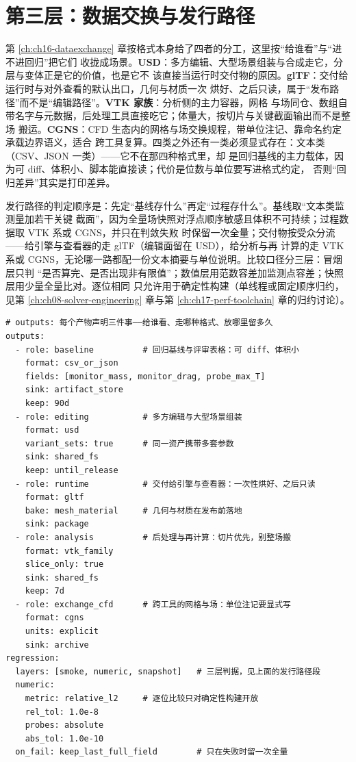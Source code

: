 \documentclass[12pt,a4paper,fontset=fandol]{ctexbook}
\begin{document}
\section{第三层：数据交换与发行路径}
\label{sec:ch18-exchange-routing}

第 \ref{ch:ch16-dataexchange} 章按格式本身给了四者的分工，这里按``给谁看''与``进不进回归''把它们
收拢成场景。\textbf{USD}：多方编辑、大型场景组装与合成走它，分层与变体正是它的价值，也是它不
该直接当运行时交付物的原因。\textbf{glTF}：交付给运行时与对外查看的默认出口，几何与材质一次
烘好、之后只读，属于``发布路径''而不是``编辑路径''。\textbf{VTK 家族}：分析侧的主力容器，网格
与场同仓、数组自带名字与元数据，后处理工具直接吃它；体量大，按切片与关键截面输出而不是整场
搬运。\textbf{CGNS}：CFD 生态内的网格与场交换规程，带单位注记、靠命名约定承载边界语义，适合
跨工具复算。四类之外还有一类必须显式存在：文本类（CSV、JSON 一类）——它不在那四种格式里，却
是回归基线的主力载体，因为可 diff、体积小、脚本能直接读；代价是位数与单位要写进格式约定，
否则``回归差异''其实是打印差异。

发行路径的判定顺序是：先定``基线存什么''再定``过程存什么''。基线取``文本类监测量加若干关键
截面''，因为全量场快照对浮点顺序敏感且体积不可持续；过程数据取 VTK 系或 CGNS，并只在判敛失败
时保留一次全量；交付物按受众分流——给引擎与查看器的走 glTF（编辑面留在 USD），给分析与再
计算的走 VTK 系或 CGNS，无论哪一路都配一份文本摘要与单位说明。比较口径分三层：冒烟层只判
``是否算完、是否出现非有限值''；数值层用范数容差加监测点容差；快照层用少量全量比对。逐位相同
只允许用于确定性构建（单线程或固定顺序归约，见第 \ref{ch:ch08-solver-engineering} 章与第
\ref{ch:ch17-perf-toolchain} 章的归约讨论）。

\begin{lstlisting}[style=yamlstyle,
  caption={结果输出与回归路由清单（示意：键名由项目自定，不属任何产品）},
  label={lst:ch18-routing}]
# outputs: 每个产物声明三件事——给谁看、走哪种格式、放哪里留多久
outputs:
  - role: baseline          # 回归基线与评审表格：可 diff、体积小
    format: csv_or_json
    fields: [monitor_mass, monitor_drag, probe_max_T]
    sink: artifact_store
    keep: 90d
  - role: editing           # 多方编辑与大型场景组装
    format: usd
    variant_sets: true      # 同一资产携带多套参数
    sink: shared_fs
    keep: until_release
  - role: runtime           # 交付给引擎与查看器：一次性烘好、之后只读
    format: gltf
    bake: mesh_material     # 几何与材质在发布前落地
    sink: package
  - role: analysis          # 后处理与再计算：切片优先，别整场搬
    format: vtk_family
    slice_only: true
    sink: shared_fs
    keep: 7d
  - role: exchange_cfd      # 跨工具的网格与场：单位注记要显式写
    format: cgns
    units: explicit
    sink: archive
regression:
  layers: [smoke, numeric, snapshot]   # 三层判据，见上面的发行路径段
  numeric:
    metric: relative_l2     # 逐位比较只对确定性构建开放
    rel_tol: 1.0e-8
    probes: absolute
    abs_tol: 1.0e-10
  on_fail: keep_last_full_field        # 只在失败时留一次全量
\end{lstlisting}
\end{document}

